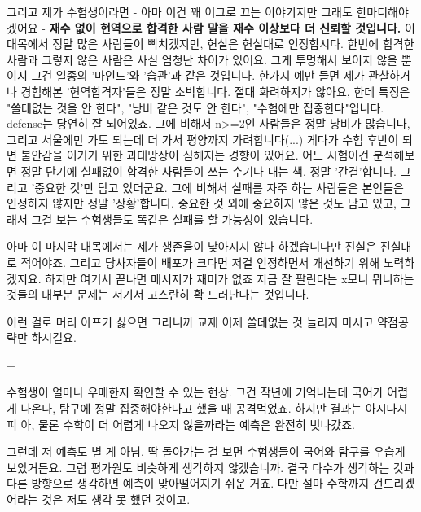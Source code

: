 그리고 제가 수험생이라면 - 아마 이건 꽤 어그로 끄는 이야기지만 그래도 한마디해야겠어요 -
\textbf{재수 없이 현역으로 합격한 사람 말을 재수 이상보다 더 신뢰할 것입니다.}
이 대목에서 정말 많은 사람들이 빡치겠지만, 현실은 현실대로 인정합시다.
한번에 합격한 사람과 그렇지 않은 사람은 사실 엄청난 차이가 있어요. 그게 투명해서 보이지 않을 뿐이지
그건 일종의 '마인드'와 '습관'과 같은 것입니다.
한가지 예만 들면 제가 관찰하거나 경험해본 '현역합격자'들은 정말 소박합니다. 절대 화려하지가 않아요,
한데 특징은 "쓸데없는 것을 안 한다", "낭비 같은 것도 안 한다", "수험에만 집중한다"입니다. defense는 당연히 잘 되어있죠.
그에 비해서 n>=2인 사람들은 정말 낭비가 많습니다, 그리고 서울에만 가도 되는데 더 가서 평양까지 가려합니다(...)
게다가 수험 후반이 되면 불안감을 이기기 위한 과대망상이 심해지는 경향이 있어요.
어느 시험이건 분석해보면 정말 단기에 실패없이 합격한 사람들이 쓰는 수기나 내는 책.
정말 '간결'합니다. 그리고 '중요한 것'만 담고 있더군요.
그에 비해서 실패를 자주 하는 사람들은 본인들은 인정하지 않지만 정말 '장황'합니다.
중요한 것 외에 중요하지 않은 것도 담고 있고, 그래서 그걸 보는 수험생들도 똑같은 실패를 할 가능성이 있습니다.
\vspace{5mm}

아마 이 마지막 대목에서는 제가 생존율이 낮아지지 않나 하겠습니다만
진실은 진실대로 적어야죠. 그리고 당사자들이 배포가 크다면 저걸 인정하면서 개선하기 위해 노력하겠지요.
하지만 여기서 끝나면 메시지가 재미가 없죠
지금 잘 팔린다는 x모니 뭐니하는 것들의 대부분 문제는 저기서 고스란히 확 드러난다는 것입니다.
\vspace{5mm}

이런 걸로 머리 아프기 싫으면 그러니까 교재 이제 쓸데없는 것 늘리지 마시고
약점공략만 하시길요.
\vspace{5mm}

+
\vspace{5mm}

수험생이 얼마나 우매한지 확인할 수 있는 현상. 그건 작년에 기억나는데
국어가 어렵게 나온다, 탐구에 정말 집중해야한다고 했을 때 공격먹었죠. 하지만 결과는 아시다시피
아, 물론 수학이 더 어렵게 나오지 않을까라는 예측은 완전히 빗나갔죠.
\vspace{5mm}

그런데 저 예측도 별 게 아님. 딱 돌아가는 걸 보면 수험생들이 국어와 탐구를 우습게 보았거든요.
그럼 평가원도 비슷하게 생각하지 않겠습니까.
결국 다수가 생각하는 것과 다른 방향으로 생각하면 예측이 맞아떨어지기 쉬운 거죠.
다만 설마 수학까지 건드리겠어라는 것은 저도 생각 못 했던 것이고.
\vspace{5mm}

